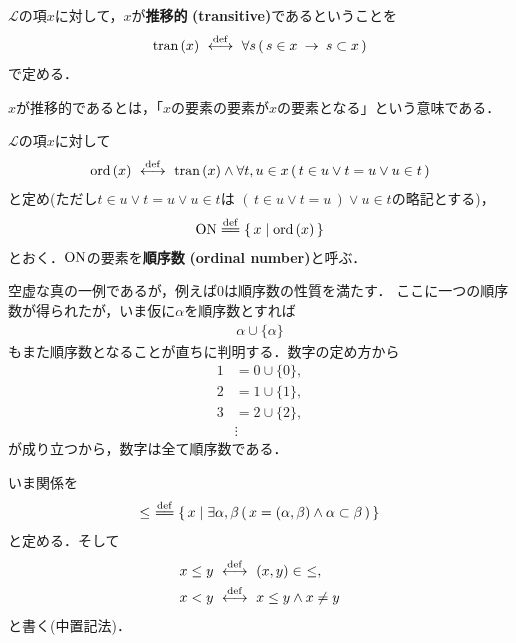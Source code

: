 	\begin{screen}
		\begin{dfn}[推移的クラス]
			$\mathcal{L}$の項$x$に対して，$x$が{\bf 推移的}
			{\bf (transitive)}であるということを
			\begin{align}
				\operatorname*{tran}\hspace{0.15em}(x) \ \overset{\mathrm{def}}{\longleftrightarrow}\ 
				\forall s\, (\, s \in x \hspace{0.25em}\rightarrow\hspace{0.25em} s \subset x\, )
			\end{align}
			で定める．
		\end{dfn}
	\end{screen}
	
	$x$が推移的であるとは，「$x$の要素の要素が$x$の要素となる」という意味である．
	
	\begin{screen}
		\begin{dfn}[順序数]
			$\mathcal{L}$の項$x$に対して
			\begin{align}
				\operatorname*{ord}\hspace{0.15em}(x) \ \overset{\mathrm{def}}{\longleftrightarrow}\  \operatorname*{tran}\hspace{0.15em}(x) \wedge 
				\forall t,u \in x\, (\, t \in u \vee t = u \vee u \in t\, )
			\end{align}
			と定め(ただし$t \in u \vee t = u \vee u \in t$は
			$(\, t \in u \vee t = u\, ) \vee u \in t$の略記とする)，
			\begin{align}
				\ON \defeq \Set{x}{\ord{x}}
			\end{align}
			とおく．$\mathrm{ON}$の要素を{\bf 順序数}\index{じゅんじょすう@順序数}
			{\bf (ordinal number)}と呼ぶ．
		\end{dfn}
	\end{screen}
	
	空虚な真の一例であるが，例えば$0$は順序数の性質を満たす．
	ここに一つの順序数が得られたが，いま仮に$\alpha$を順序数とすれば
	\begin{align}
		\alpha \cup \{\alpha\}
	\end{align}
	もまた順序数となることが直ちに判明する．数字の定め方から
	\begin{align}
		1 &= 0 \cup \{0\}, \\
		2 &= 1 \cup \{1\}, \\
		3 &= 2 \cup \{2\}, \\
		&\vdots
	\end{align}
	が成り立つから，数字は全て順序数である．
	
	いま関係を
	\begin{align}
		\leq\ \defeq \Set{x}{\exists \alpha,\beta\, 
		(\, x=(\alpha,\beta) \wedge \alpha \subset \beta\, )}
	\end{align}
	と定める．そして
	\begin{align}
		x \leq y &\ \overset{\mathrm{def}}{\longleftrightarrow}\  (x,y) \in\ \leq, \\
		x < y &\ \overset{\mathrm{def}}{\longleftrightarrow}\  x \leq y \wedge x \neq y
	\end{align}
	と書く(中置記法)．
	

